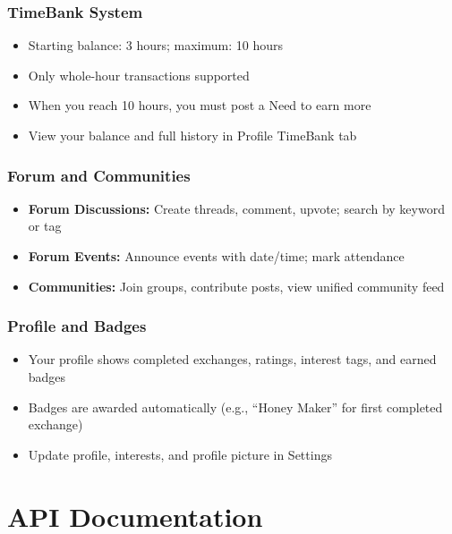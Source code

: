\documentclass[11pt,a4paper]{report}
\begin{document}
\subsection{TimeBank System}

\begin{itemize}
    \item Starting balance: 3 hours; maximum: 10 hours
    \item Only whole-hour transactions supported
    \item When you reach 10 hours, you must post a Need to earn more
    \item View your balance and full history in Profile \textrightarrow{} TimeBank tab
\end{itemize}

\subsection{Forum and Communities}

\begin{itemize}
    \item \textbf{Forum Discussions:} Create threads, comment, upvote; search by keyword or tag
    \item \textbf{Forum Events:} Announce events with date/time; mark attendance
    \item \textbf{Communities:} Join groups, contribute posts, view unified community feed
\end{itemize}

\subsection{Profile and Badges}

\begin{itemize}
    \item Your profile shows completed exchanges, ratings, interest tags, and earned badges
    \item Badges are awarded automatically (e.g., ``Honey Maker'' for first completed exchange)
    \item Update profile, interests, and profile picture in Settings
\end{itemize}

\chapter{API Documentation}
\end{document}
